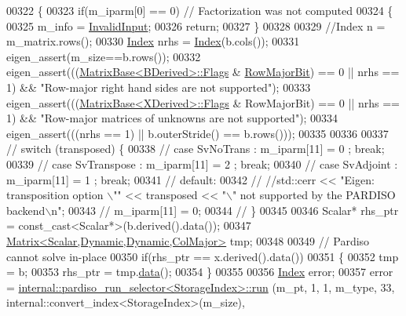 \begin{DoxyCode}
00322 \textcolor{keyword}{}\{
00323   \textcolor{keywordflow}{if}(m\_iparm[0] == 0) \textcolor{comment}{// Factorization was not computed}
00324   \{
00325     m\_info = \hyperlink{group__enums_gga85fad7b87587764e5cf6b513a9e0ee5ea945604f62795ffc70aedf2bd12ea0434}{InvalidInput};
00326     \textcolor{keywordflow}{return};
00327   \}
00328 
00329   \textcolor{comment}{//Index n = m\_matrix.rows();}
00330   \hyperlink{namespace_eigen_a62e77e0933482dafde8fe197d9a2cfde}{Index} nrhs = \hyperlink{namespace_eigen_a62e77e0933482dafde8fe197d9a2cfde}{Index}(b.cols());
00331   eigen\_assert(m\_size==b.rows());
00332   eigen\_assert(((\hyperlink{group___core___module_class_eigen_1_1_matrix_base}{MatrixBase<BDerived>::Flags} & 
      \hyperlink{group__flags_gae4f56c2a60bbe4bd2e44c5b19cbe8762}{RowMajorBit}) == 0 || nrhs == 1) && \textcolor{stringliteral}{"Row-major right hand sides are not supported"});
00333   eigen\_assert(((\hyperlink{group___core___module_class_eigen_1_1_matrix_base}{MatrixBase<XDerived>::Flags} & RowMajorBit) == 0 || nrhs == 1) 
      && \textcolor{stringliteral}{"Row-major matrices of unknowns are not supported"});
00334   eigen\_assert(((nrhs == 1) || b.outerStride() == b.rows()));
00335 
00336 
00337 \textcolor{comment}{//  switch (transposed) \{}
00338 \textcolor{comment}{//    case SvNoTrans    : m\_iparm[11] = 0 ; break;}
00339 \textcolor{comment}{//    case SvTranspose  : m\_iparm[11] = 2 ; break;}
00340 \textcolor{comment}{//    case SvAdjoint    : m\_iparm[11] = 1 ; break;}
00341 \textcolor{comment}{//    default:}
00342 \textcolor{comment}{//      //std::cerr << "Eigen: transposition  option \(\backslash\)"" << transposed << "\(\backslash\)" not supported by the PARDISO
       backend\(\backslash\)n";}
00343 \textcolor{comment}{//      m\_iparm[11] = 0;}
00344 \textcolor{comment}{//  \}}
00345 
00346   Scalar* rhs\_ptr = \textcolor{keyword}{const\_cast<}Scalar*\textcolor{keyword}{>}(b.derived().data());
00347   \hyperlink{group___core___module_class_eigen_1_1_matrix}{Matrix<Scalar,Dynamic,Dynamic,ColMajor>} tmp;
00348   
00349   \textcolor{comment}{// Pardiso cannot solve in-place}
00350   \textcolor{keywordflow}{if}(rhs\_ptr == x.derived().data())
00351   \{
00352     tmp = b;
00353     rhs\_ptr = tmp.\hyperlink{class_eigen_1_1_plain_object_base_ac25699535374b1854cf8494e44ad31b2}{data}();
00354   \}
00355   
00356   \hyperlink{namespace_eigen_a62e77e0933482dafde8fe197d9a2cfde}{Index} error;
00357   error = \hyperlink{struct_eigen_1_1internal_1_1pardiso__run__selector}{internal::pardiso\_run\_selector<StorageIndex>::run}
      (m\_pt, 1, 1, m\_type, 33, internal::convert\_index<StorageIndex>(m\_size),

\end{DoxyCode}
